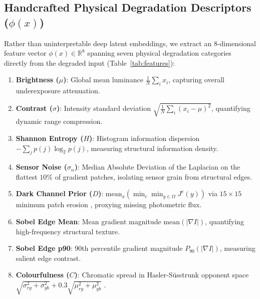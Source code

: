 \documentclass[journal]{IEEEtran}
\begin{document}
\subsection{Handcrafted Physical Degradation Descriptors (\texorpdfstring{$\phi(x)$}{phi(x)})}
Rather than uninterpretable deep latent embeddings, we extract an 8-dimensional feature vector $\phi(x) \in \mathbb{R}^8$ spanning seven physical degradation categories directly from the degraded input (Table~\ref{tab:features}):
\begin{enumerate}
    \setlength{\itemsep}{1pt}
    \setlength{\parskip}{0pt}
    \item \textbf{Brightness ($\mu$)}: Global mean luminance $\frac{1}{N} \sum_i x_i$, capturing overall underexposure attenuation.
    \item \textbf{Contrast ($\sigma$)}: Intensity standard deviation $\sqrt{\frac{1}{N} \sum_i (x_i - \mu)^2}$, quantifying dynamic range compression.
    \item \textbf{Shannon Entropy ($H$)}: Histogram information dispersion $-\sum_j p(j) \log_2 p(j)$, measuring structural information density.
    \item \textbf{Sensor Noise ($\sigma_n$)}: Median Absolute Deviation of the Laplacian on the flattest $10\%$ of gradient patches, isolating sensor grain from structural edges.
    \item \textbf{Dark Channel Prior ($D$)}: $\text{mean}_x(\min_c \min_{y \in \Omega} J^c(y))$ via $15\times 15$ minimum patch erosion \cite{he2011single, dong2011fast}, proxying missing photometric flux.
    \item \textbf{Sobel Edge Mean}: Mean gradient magnitude $\text{mean}(|\nabla I|)$, quantifying high-frequency structural texture.
    \item \textbf{Sobel Edge p90}: 90th percentile gradient magnitude $P_{90}(|\nabla I|)$, measuring salient edge contrast.
    \item \textbf{Colourfulness ($C$)}: Chromatic spread in Hasler-S{\"u}sstrunk opponent space $\sqrt{\sigma_{rg}^2 + \sigma_{yb}^2} + 0.3 \sqrt{\mu_{rg}^2 + \mu_{yb}^2}$ \cite{hasler2003measuring}.
\end{enumerate}
\end{document}
